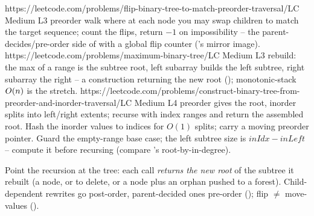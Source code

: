 \begin{practiceset}
    {https://leetcode.com/problems/flip-binary-tree-to-match-preorder-traversal/}{LC Medium L3}
    {preorder walk where at each node you may swap children to match the target
    sequence; count the flips, return $-1$ on impossibility -- the
    parent-decides/pre-order side of  with a global flip
    counter ('s mirror image).}
    {https://leetcode.com/problems/maximum-binary-tree/}{LC Medium L3}
    {rebuild: the max of a range is the subtree root, left subarray builds the left
    subtree, right subarray the right -- a construction returning the new root
    (); monotonic-stack $O(n)$ is the stretch.}
    {https://leetcode.com/problems/construct-binary-tree-from-preorder-and-inorder-traversal/}{LC Medium L4}
    {preorder gives the root, inorder splits into left/right extents; recurse with
    index ranges and return the assembled root.}
    {Hash the inorder values to indices for $O(1)$ splits; carry a moving preorder
    pointer.}
    {Guard the empty-range base case; the left subtree size is
    $\mathit{inIdx}-\mathit{inLeft}$ -- compute it before recursing (compare
    's root-by-in-degree).}
\end{practiceset}

\begin{recallbox}
Point the recursion at the tree: each call \emph{returns the new root} of the
subtree it rebuilt (a node, or  to delete, or a node plus an orphan
pushed to a forest). Child-dependent rewrites go post-order, parent-decided ones
pre-order (); flip $\ne$ move-values ().
\end{recallbox}
